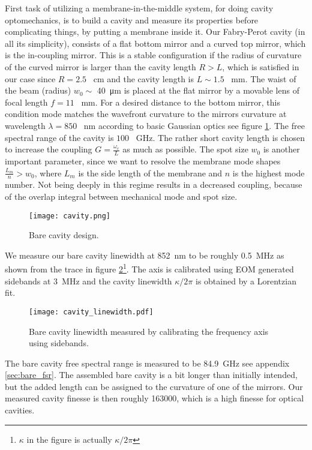 First task of utilizing a membrane-in-the-middle system, for doing cavity optomechanics, is to build a cavity and measure its properties before complicating things, by putting a membrane inside it. Our Fabry-Perot cavity (in all its simplicity), consists of a flat bottom mirror and a curved top mirror, which is the in-coupling mirror. This is a stable configuration if the radius of curvature of the curved mirror is larger than the cavity length $R > L$, which is satisfied in our case since $R = 2.5$ \SI{}{\centi\meter} and the cavity length is $L \sim 1.5$ \SI{}{\milli\meter}. The waist of the beam (radius) $w_0 \sim$ \SI{40}{\micro\meter} is placed at the flat mirror by a movable lens of focal length $f = 11$ \SI{}{\milli\meter}. For a desired distance to the bottom mirror, this condition mode matches the wavefront curvature to the mirrors curvature at wavelength $\lambda = 850$ \SI{}{\nano\meter} according to basic Gaussian optics see figure \ref{fig:bare_cavity}. The free spectral range of the cavity is $100$ \SI{}{\giga\hertz}. The rather short cavity length is chosen to increase the coupling $G = \frac{\omega_c}{L}$ as much as possible. The spot size $w_0$ is another important parameter, since we want to resolve the membrane mode shapes $\frac{L_m}{n} > w_0$, where $L_m$ is the side length of the membrane and $n$ is the highest mode number. Not being deeply in this regime results in a decreased coupling, because of the overlap integral between mechanical mode and spot size.

\begin{figure}[h]
\centering
\texttt{[image: cavity.png]}
\caption{Bare cavity design.}
\label{fig:bare_cavity}
\end{figure}

We measure our bare cavity linewidth at \SI{852}{\nano\meter} to be roughly \SI{0.5}{\mega\hertz} as shown from the trace in figure \ref{fig:bare_cavity_linewidth}\footnote{$\kappa$ in the figure is actually $\kappa/2\pi$}. The axis is calibrated using EOM generated sidebands at \SI{3}{\mega\hertz} and the cavity linewidth $\kappa/2\pi$ is obtained by a Lorentzian fit.

\begin{figure}[h]
\centering
\texttt{[image: cavity\_linewidth.pdf]}
\caption{Bare cavity linewidth measured by calibrating the frequency axis using sidebands.}
\label{fig:bare_cavity_linewidth}
\end{figure}

The bare cavity free spectral range is measured to be \SI{84.9}{\giga\hertz} see appendix \ref{sec:bare_fsr}. The assembled bare cavity is a bit longer than initially intended, but the added length can be assigned to the curvature of one of the mirrors. Our measured cavity finesse is then roughly 163000, which is a high finesse for optical cavities.